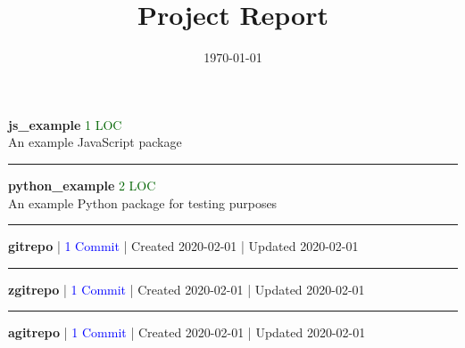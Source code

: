 \documentclass[]{article}
\begin{document}
\title{Project Report}
\author{}
\date{\today}
\maketitle
\textbf{js\_example}
\textcolor{darkgreen}{1 LOC}
\\
An example JavaScript package
\\
\noindent\rule{\textwidth}{0.4pt}


\vspace{0.5cm}
\textbf{python\_example}
\textcolor{darkgreen}{2 LOC}
\\
An example Python package for testing purposes
\\
\noindent\rule{\textwidth}{0.4pt}


\vspace{0.5cm}
\textbf{gitrepo}
|
\textcolor{blue}{1 Commit}
|
Created 2020-02-01
|
Updated 2020-02-01
\\
\noindent\rule{\textwidth}{0.4pt}


\vspace{0.5cm}
\textbf{zgitrepo}
|
\textcolor{blue}{1 Commit}
|
Created 2020-02-01
|
Updated 2020-02-01
\\
\noindent\rule{\textwidth}{0.4pt}


\vspace{0.5cm}
\textbf{agitrepo}
|
\textcolor{blue}{1 Commit}
|
Created 2020-02-01
|
Updated 2020-02-01
\\
\end{document}
